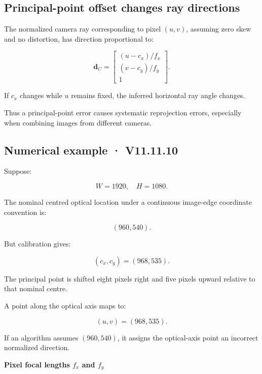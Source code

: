 \subsection{Principal-point offset changes ray directions}\label{02-foundations-ii-ch034-principal-point-offset-changes-ray-directions}

\hypertarget{02-foundations-ii-ch034-principal-point-offset-changes-ray-directions}{}

The normalized camera ray corresponding to pixel \((u,v)\), assuming zero skew and no distortion, has direction proportional to:

\[
 \boxed{ \mathbf d_C= \begin{bmatrix} (u-c_x)/f_x\\ (v-c_y)/f_y\\ 1 \end{bmatrix} }.
\]

If \(c_x\) changes while \(u\) remains fixed, the inferred horizontal ray angle changes.

Thus a principal-point error causes systematic reprojection errors, especially when combining images from different cameras.

\subsection{Numerical example · V11.11.10}\label{02-foundations-ii-ch034-numerical-example-v11.11.10}

\hypertarget{02-foundations-ii-ch034-numerical-example-v11.11.10}{}

Suppose:

\[
 W=1920,\quad H=1080.
\]

The nominal centred optical location under a continuous image-edge coordinate convention is:

\[
 (960,540).
\]

But calibration gives:

\[
 (c_x,c_y)=(968,535).
\]

The principal point is shifted eight pixels right and five pixels upward relative to that nominal centre.

A point along the optical axis maps to:

\[
 \boxed{(u,v)=(968,535)}.
\]

If an algorithm assumes \((960,540)\), it assigns the optical-axis point an incorrect normalized direction.

\textbf{Pixel focal lengths \(f_x\) and \(f_y\)}

